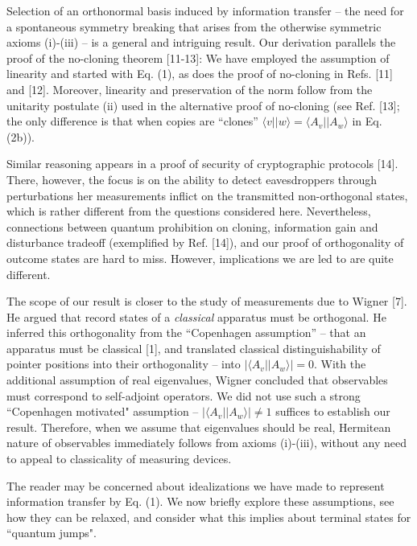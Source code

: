\documentclass[aps,twocolumn,pra]{revtex4}
\newcommand{\bra}[1]    {\langle #1|}
\newcommand{\ket}[1]    {| #1 \rangle}
\newcommand{\+}         {\dagger}
\begin{document}
Selection of an orthonormal basis induced by information transfer -- the need for a spontaneous symmetry breaking that arises from the otherwise symmetric axioms (i)-(iii) -- is a general and intriguing result. Our derivation parallels the proof of the no-cloning theorem [11-13]: We have employed the assumption of linearity and started with Eq. (1), as does the proof of no-cloning in Refs. [11] and [12]. Moreover, linearity and preservation of the norm follow from the unitarity postulate (ii) used in the alternative proof of no-cloning (see Ref. [13]; the only difference is that when copies are ``clones''  $\bra {v} \ket {w}=\bra {A_v} \ket {A_w}$ in Eq. (2b)). 

Similar reasoning appears in a proof of security of cryptographic protocols [14]. There, however, the focus is on the ability to detect eavesdroppers through perturbations her measurements inflict on the transmitted non-orthogonal states, which is rather different from the questions considered here. 
Nevertheless, connections between quantum prohibition on cloning, information gain and disturbance 
tradeoff (exemplified by Ref. [14]),  and our proof of orthogonality of outcome states are
hard to miss. However, implications we are led to are quite different.

The scope of our result is closer to the study of measurements due to Wigner [7]. He argued 
that record states of a {\it classical} apparatus must be orthogonal. He inferred this orthogonality from 
the ``Copenhagen assumption'' -- that an apparatus must be classical [1], and translated classical 
distinguishability of pointer positions into their orthogonality -- into $|\bra {A_v}\ket{A_w}| =0$. 
With the additional assumption of real eigenvalues, Wigner concluded that observables must 
correspond to self-adjoint operators. We did not use such a strong ``Copenhagen motivated" 
assumption -- $|\bra {A_v}\ket{A_w}| \neq 1 $ suffices to establish our result. Therefore, when we 
assume that eigenvalues should be real, Hermitean nature of observables immediately follows from 
axioms (i)-(iii), without any need to appeal to classicality of measuring devices.

The reader may be concerned about idealizations we have made to represent information transfer by 
Eq. (1). We now briefly explore these assumptions, see how they can be relaxed, and consider 
what this implies about terminal states for ``quantum jumps".
\end{document}
